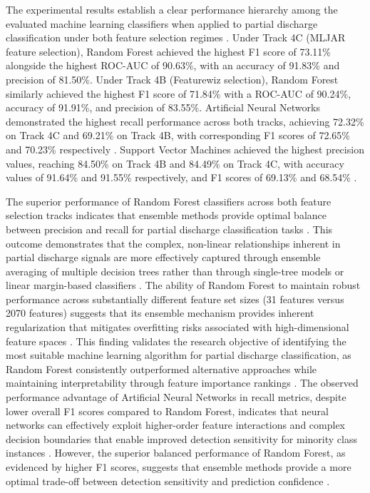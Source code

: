 The experimental results establish a clear performance hierarchy among the evaluated machine learning classifiers when applied to partial discharge classification under both feature selection regimes \parencite{Govindarajan_2023_1, Aldosari_2023}. Under Track 4C (MLJAR feature selection), Random Forest achieved the highest F1 score of 73.11\% alongside the highest ROC-AUC of 90.63\%, with an accuracy of 91.83\% and precision of 81.50\%. Under Track 4B (Featurewiz selection), Random Forest similarly achieved the highest F1 score of 71.84\% with a ROC-AUC of 90.24\%, accuracy of 91.91\%, and precision of 83.55\%. Artificial Neural Networks demonstrated the highest recall performance across both tracks, achieving 72.32\% on Track 4C and 69.21\% on Track 4B, with corresponding F1 scores of 72.65\% and 70.23\% respectively \parencite{Srivastava_2023_1, Aldosari_2023}. Support Vector Machines achieved the highest precision values, reaching 84.50\% on Track 4B and 84.49\% on Track 4C, with accuracy values of 91.64\% and 91.55\% respectively, and F1 scores of 69.13\% and 68.54\% \parencite{Govindarajan_2021_3, Aldosari_2023}.

The superior performance of Random Forest classifiers across both feature selection tracks indicates that ensemble methods provide optimal balance between precision and recall for partial discharge classification tasks \parencite{Govindarajan_2023_1, Aldosari_2023}. This outcome demonstrates that the complex, non-linear relationships inherent in partial discharge signals are more effectively captured through ensemble averaging of multiple decision trees rather than through single-tree models or linear margin-based classifiers \parencite{Govindarajan_2021_3, Srivastava_2023_1}. The ability of Random Forest to maintain robust performance across substantially different feature set sizes (31 features versus 2070 features) suggests that its ensemble mechanism provides inherent regularization that mitigates overfitting risks associated with high-dimensional feature spaces \parencite{Aldosari_2023, Zemouri_2023_1}. This finding validates the research objective of identifying the most suitable machine learning algorithm for partial discharge classification, as Random Forest consistently outperformed alternative approaches while maintaining interpretability through feature importance rankings \parencite{Govindarajan_2023_1, Seitz_2024_1}. The observed performance advantage of Artificial Neural Networks in recall metrics, despite lower overall F1 scores compared to Random Forest, indicates that neural networks can effectively exploit higher-order feature interactions and complex decision boundaries that enable improved detection sensitivity for minority class instances \parencite{Srivastava_2023_1, Aldosari_2023}. However, the superior balanced performance of Random Forest, as evidenced by higher F1 scores, suggests that ensemble methods provide a more optimal trade-off between detection sensitivity and prediction confidence \parencite{Govindarajan_2023_1, Zemouri_2023_1}.

